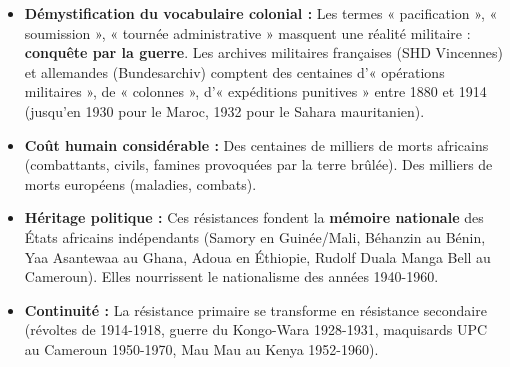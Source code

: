 \documentclass[11pt]{article}
\begin{document}
\begin{aretenir}
\begin{itemize}
    \item \textbf{Démystification du vocabulaire colonial :} Les termes « pacification », « soumission », « tournée administrative » masquent une réalité militaire : \textbf{conquête par la guerre}. Les archives militaires françaises (SHD Vincennes) et allemandes (Bundesarchiv) comptent des centaines d'« opérations militaires », de « colonnes », d'« expéditions punitives » entre 1880 et 1914 (jusqu'en 1930 pour le Maroc, 1932 pour le Sahara mauritanien).
    \item \textbf{Coût humain considérable :} Des centaines de milliers de morts africains (combattants, civils, famines provoquées par la terre brûlée). Des milliers de morts européens (maladies, combats).
    \item \textbf{Héritage politique :} Ces résistances fondent la \textbf{mémoire nationale} des États africains indépendants (Samory en Guinée/Mali, Béhanzin au Bénin, Yaa Asantewaa au Ghana, Adoua en Éthiopie, Rudolf Duala Manga Bell au Cameroun). Elles nourrissent le nationalisme des années 1940-1960.
    \item \textbf{Continuité :} La résistance primaire se transforme en résistance secondaire (révoltes de 1914-1918, guerre du Kongo-Wara 1928-1931, maquisards UPC au Cameroun 1950-1970, Mau Mau au Kenya 1952-1960).
\end{itemize}
\end{aretenir}
\end{document}
